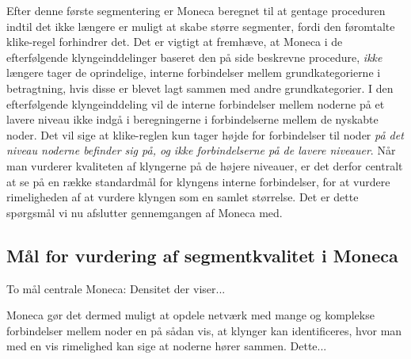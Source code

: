 Efter denne  første segmentering er Moneca beregnet til at gentage proceduren indtil det ikke længere er muligt at skabe større segmenter, fordi den føromtalte klike-regel forhindrer det. Det er vigtigt at fremhæve, at Moneca i de efterfølgende klyngeinddelinger baseret den på side \pageref{monecastepbystep} beskrevne procedure, \emph{ikke} længere tager de oprindelige, interne forbindelser mellem grundkategorierne i betragtning, hvis disse er blevet lagt sammen med andre grundkategorier. I den efterfølgende klyngeinddeling vil de interne forbindelser mellem noderne på et lavere niveau ikke indgå i beregningerne i forbindelserne mellem de nyskabte noder. Det vil sige at klike-reglen kun tager højde for forbindelser til noder \emph{på det niveau noderne befinder sig på, og ikke forbindelserne på de lavere niveauer}. Når man vurderer kvaliteten af klyngerne på de højere niveauer, er det derfor centralt at se på en række standardmål for klyngens interne forbindelser, for at vurdere rimeligheden af at vurdere klyngen som en samlet størrelse. Det er dette spørgsmål vi nu afslutter gennemgangen af Moneca med.



\subsection{Mål for vurdering af segmentkvalitet i Moneca \label{}}

To mål centrale Moneca: Densitet der viser...




Moneca gør det dermed muligt at opdele netværk med mange og komplekse forbindelser mellem noder en på sådan vis, at klynger kan identificeres, hvor man med en vis rimelighed kan sige at noderne hører sammen. Dette...


